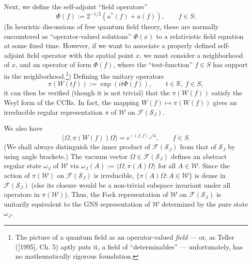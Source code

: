 \documentclass[12pt]{article}
\theoremstyle{remark}
\theoremstyle{definition}
\newcommand{\alg}[1]{\mathcal{#1}}
\newcommand{\hil}[1]{\mathcal{#1}}
\begin{document}
Next, we define the self-adjoint ``field operators''
 \begin{equation} \label{eq:star} \Phi (f):= 2^{-1/2}(a^{*}(f)+a(f)) , \qquad f\in S.
\end{equation}
(In heuristic 
discussions of free quantum field theory, these are normally encountered as 
``operator-valued solutions'' $\Phi(x)$ to a relativistic field 
equation at some fixed time.  However, if
 we want to associate a properly defined self-adjoint field operator with the 
 spatial point $x$, we must consider a neighborhood of $x$, and an operator 
 of form $\Phi(f)$, where the ``test-function'' $f\in S$ has support in 
 the neighborhood.\footnote{The picture of a quantum field as an 
 operator-valued \emph{field} --- or, as Teller ([1995], Ch. 5) aptly puts 
 it, a field 
 of ``determinables'' --- unfortunately, has no mathematically rigorous 
 foundation.})
Defining the unitary operators
\begin{equation} \label{eq:reg}
\pi(W(tf)):=\exp (it\Phi (f)), \qquad t\in \mathbb{R},\ f\in S,
\end{equation}
it can then be verified (though it is not trivial) that the
$\pi(W(f))$ satisfy the Weyl form of the CCRs. In fact, the mapping
$W(f)\mapsto \pi (W(f))$ gives an irreducible regular representation
$\pi$ of $\alg{W}$ on $\hil{F}(\hil{S}_{J})$.
  
We also have 
\begin{equation} \langle \Omega ,\pi(W(f))\Omega \rangle 
=e^{-(f,f)_{J}/4}, \qquad f\in S.  \label{eq:vacuum}
\end{equation} (We shall always distinguish the inner product of 
$\hil{F}(\hil{S}_{J})$ from that of $\hil{S}_{J}$ by using angle brackets.) 
The vacuum vector $\Omega \in \hil{F}(\hil{S}_{J})$ defines an
abstract regular state $\omega _{J}$ of $\alg{W}$ via $\omega_{J} (A):=
\langle \Omega ,\pi (A)\Omega \rangle$ for all $A\in
  \alg{W}$.  Since the action of $\pi (\alg{W})$ on
$\hil{F}(\hil{S}_{J})$ is irreducible, $\{ \pi (A)\Omega :A\in \alg{W}
\}$ is dense in $\hil{F}(\hil{S}_{J})$ (else its closure would be a
non-trivial subspace invariant under all operators in $\pi
(\alg{W})$).  Thus, the Fock representation of $\alg{W}$ on
$\hil{F}(\hil{S}_{J})$ is unitarily equivalent to the GNS representation of $\alg{W}$
determined by the pure state $\omega _{J}$.  
\end{document}
